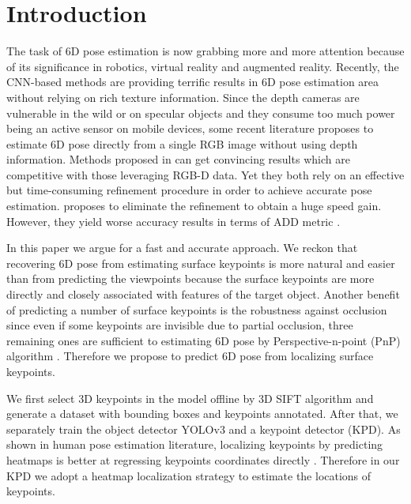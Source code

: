 \documentclass[10pt,twocolumn,letterpaper]{article}
\begin{document}
\section{Introduction}
The task of 6D pose estimation is now grabbing more and more attention because of its significance in robotics, virtual reality and augmented reality. Recently, the CNN-based methods \cite{Kehl2017SSD6DMR, Rad2017BB8AS, tekin18, 7298758, xiang2018posecnn} are providing terrific results in 6D pose estimation area without relying on rich texture information. Since the depth cameras are vulnerable in the wild or on specular objects and they consume too much power being an active sensor on mobile devices, some recent literature \cite{Kehl2017SSD6DMR, Rad2017BB8AS, tekin18} proposes to estimate 6D pose directly from a single RGB image without using depth information. Methods proposed in \cite{Kehl2017SSD6DMR, Rad2017BB8AS} can get convincing results which are competitive with those leveraging RGB-D data. Yet they both rely on an effective but time-consuming refinement procedure in order to achieve accurate pose estimation. \cite{tekin18} proposes to eliminate the refinement to obtain a huge speed gain. However, they yield worse accuracy results in terms of ADD metric \cite{Hinterstoisser:2012:MBT:2481913.2481959}.

In this paper we argue for a fast and accurate approach. We reckon that recovering 6D pose from estimating surface keypoints is more natural and easier than from predicting the viewpoints because the surface keypoints are more directly and closely associated with features of the target object. Another benefit of predicting a number of surface keypoints is the robustness against occlusion since even if some keypoints are invisible due to partial occlusion, three remaining ones are sufficient to estimating 6D pose by Perspective-n-point (PnP) algorithm \cite{Lepetit2008EPnPAA}. Therefore we propose to predict 6D pose from localizing surface keypoints.

We first select  3D keypoints in the model offline by 3D SIFT algorithm \cite{Scovanner:2007:SDA:1291233.1291311} and generate a dataset with bounding boxes and keypoints annotated. After that, we separately train the object detector YOLOv3 \cite{DBLP:journals/corr/abs-1804-02767} and a keypoint detector (KPD). As shown in human pose estimation literature, localizing keypoints by predicting heatmaps \cite{Newell2016StackedHN, tompson2014joint, wei2016convolutional} is better at regressing keypoints coordinates directly \cite{toshev2014deeppose}. Therefore in our KPD we adopt a heatmap localization strategy to estimate the locations of keypoints.
\end{document}
